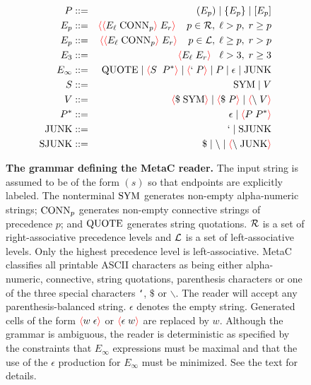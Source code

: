 \documentclass{article}
\newcommand{\fopen}{{\color{red} \langle}}
\newcommand{\fclose}{{\color{red} \rangle}}
\begin{document}
\begin{figure}
  
\begin{eqnarray*}
  P & ::= & (E_p) \;|\; \{E_p\} \;|\; [E_p] \\
  E_p & ::= & \fopen \fopen E_\ell\;\conn_p\fclose \;E_r\fclose\;\;\;\;p \in {\cal R}, \;\ell > p, \; r \geq p \\
  E_p & ::= & \fopen \fopen E_\ell\;\conn_p\fclose \;E_r\fclose\;\;\;\;p \in {\cal L}, \; \ell \geq p,\; r > p \\
  E_3 & ::= & \fopen E_\ell \;E_r\fclose \;\;\;\ell > 3,\;r \geq 3\\
  E_\infty & ::= & \quot \;|\; \fopen S \; \;P^* \fclose \;|\; \fopen `\;P\fclose \;|\; P \;|\; \epsilon \;|\; \mathrm{JUNK}\\
  S & ::= & \;\sym \;|\; V \\
  V & ::= & \fopen \$\;\sym\fclose \;|\; \fopen \$\;P\fclose \;|\; \fopen \backslash \; V \fclose\\
  P^* & ::= &  \epsilon  \;|\; \fopen P\;P^* \fclose \\
  \mathrm{JUNK} & ::= & ` \;|\; \mathrm{SJUNK} \\
  \mathrm{SJUNK} & :: = & \$ \;|\;  \backslash \;|\; \fopen \backslash\;\mathrm{JUNK} \fclose\\
\end{eqnarray*}

\caption{{\bf The grammar defining the MetaC reader.} The input string is assumed to be of the form $(s)$ so that endpoints are explicitly labeled.
The nonterminal $\mathrm{SYM}$ generates non-empty alpha-numeric strings; $\mathrm{CONN}_p$ generates non-empty connective
strings of precedence $p$; and $\mathrm{QUOTE}$ generates string quotations.  ${\cal R}$ is a set of right-associative precedence levels and ${\cal L}$ is a set of left-associative levels.
Only the highest precedence level is left-associative. MetaC classifies all printable ASCII characters as being either alpha-numeric, connective, string quotations, parenthesis characters or one of the three special characters
{\tt `}, $\$$ or $\backslash$.
The reader will accept any parenthesis-balanced string. $\epsilon$ denotes the empty string. Generated cells of the form $\fopen w\;\epsilon \fclose$ or $\fopen \epsilon \;w\fclose$ are replaced by $w$.
Although the grammar is ambiguous, the reader is deterministic as specified by the constraints that
$E_\infty$ expressions must be maximal and that the use of the $\epsilon$ production for $E_\infty$ must be minimized.  See the text for details.
  }
\label{fig:grammar}
\end{figure}
\end{document}

